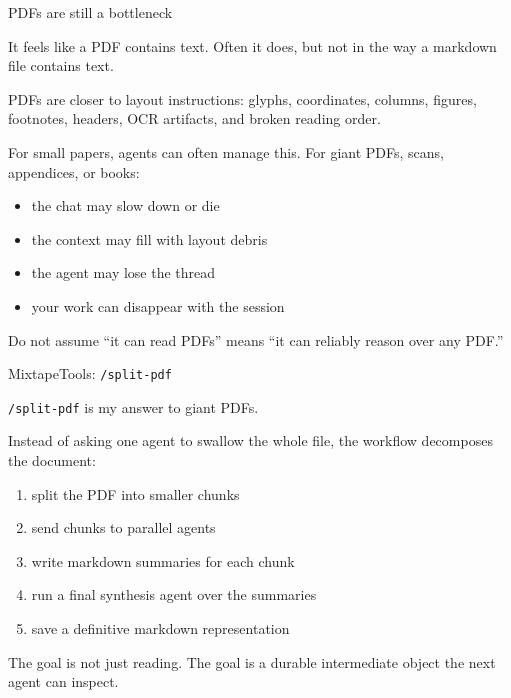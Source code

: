 \documentclass[aspectratio=169,11pt]{beamer}
\begin{document}
\begin{frame}{PDFs are still a bottleneck}

It feels like a PDF contains text. Often it does, but not in the way a markdown file contains text.

\vspace{0.3cm}

PDFs are closer to layout instructions: glyphs, coordinates, columns, figures, footnotes, headers, OCR artifacts, and broken reading order.

\vspace{0.3cm}

For small papers, agents can often manage this. For giant PDFs, scans, appendices, or books:

\begin{itemize}\setlength\itemsep{0.25em}
    \item the chat may slow down or die
    \item the context may fill with layout debris
    \item the agent may lose the thread
    \item your work can disappear with the session
\end{itemize}

\vspace{0.25cm}

\alert{Do not assume ``it can read PDFs'' means ``it can reliably reason over any PDF.''}

\end{frame}

\begin{frame}{MixtapeTools: \texttt{/split-pdf}}

\texttt{/split-pdf} is my answer to giant PDFs.

\vspace{0.25cm}

Instead of asking one agent to swallow the whole file, the workflow decomposes the document:

\begin{enumerate}\setlength\itemsep{0.25em}
    \item split the PDF into smaller chunks
    \item send chunks to parallel agents
    \item write markdown summaries for each chunk
    \item run a final synthesis agent over the summaries
    \item save a definitive markdown representation
\end{enumerate}

\vspace{0.25cm}

\alert{The goal is not just reading. The goal is a durable intermediate object the next agent can inspect.}

\end{frame}
\end{document}
